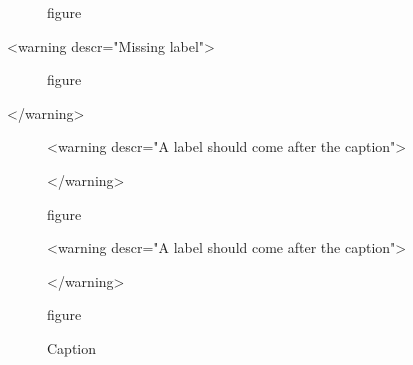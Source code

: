 \documentclass{article}
\begin{document}
    \begin{figure}
        \caption{figure}
        \label{fig:good-label}
    \end{figure}

    <warning descr="Missing label">\begin{figure}
        \caption{figure}
    \end{figure}</warning>

    \begin{figure}
        <warning descr="A label should come after the caption">\label{fig:wrong-label}
        \caption{figure}</warning>
    \end{figure}

    \begin{figure}
        <warning descr="A label should come after the caption">\label{fig:wrong-label2}\caption{figure}</warning>
    \end{figure}

    \begin{figure}[ht]
        \centering
        \caption{Caption}\label{fig:figure}
    \end{figure}
\end{document}
